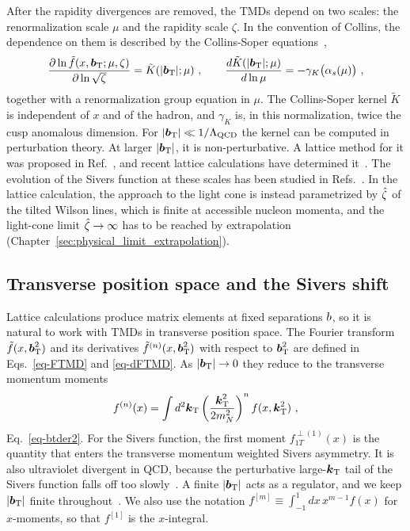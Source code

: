 After the rapidity divergences are removed, the TMDs depend on two scales: the renormalization scale $\mu$ and the rapidity scale $\zeta$. In the convention of Collins, the dependence on them is described by the Collins-Soper equations~\cite{Collins:1981uk,Collins:1984kg,CollinsBook2011},
\begin{equation}
  \frac{\partial\ln\tilde{f}(x,\boldsymbol{b}_{\mathrm T};\mu,\zeta)}{\partial\ln\sqrt{\zeta}} = \tilde{K}(|\boldsymbol{b}_{\mathrm T}|;\mu) \ ,\qquad
  \frac{d\tilde{K}(|\boldsymbol{b}_{\mathrm T}|;\mu)}{d\ln\mu} = -\gamma_K\big(\alpha_s(\mu)\big) \ ,
  \label{eq:cs_equation}
\end{equation}
together with a renormalization group equation in $\mu$. The Collins-Soper kernel $\tilde K$ is independent of $x$ and of the hadron, and $\gamma_K$ is, in this normalization, twice the cusp anomalous dimension. For $|\boldsymbol{b}_{\mathrm T}|\ll 1/\Lambda_{\text{QCD}}$ the kernel can be computed in perturbation theory. At larger $|\boldsymbol{b}_{\mathrm T}|$, it is non-perturbative. A lattice method for it was proposed in Ref.~\cite{Ebert:2018gzl}, and recent lattice calculations have determined it~\cite{Shanahan:2021tst,Schlemmer:2021aij,LatticePartonLPC:2022eev}. The evolution of the Sivers function at these scales has been studied in Refs.~\cite{Aybat:2011ge,Echevarria:2014xaa}. In the lattice calculation, the approach to the light cone is instead parametrized by ${\hat \zeta}$ of the tilted Wilson lines, which is finite at accessible nucleon momenta, and the light-cone limit ${\hat \zeta}\to\infty$ has to be reached by extrapolation (Chapter~\ref{sec:physical_limit_extrapolation}).

\subsection{Transverse position space and the Sivers shift}
\label{sec:bt_space_sivers_shift}

Lattice calculations produce matrix elements at fixed separations $b$, so it is natural to work with TMDs in transverse position space. The Fourier transform $\tilde f(x,\boldsymbol{b}_{\mathrm T}^2)$ and its derivatives $\tilde f^{(n)}(x,\boldsymbol{b}_{\mathrm T}^2)$ with respect to $\boldsymbol{b}_{\mathrm T}^2$ are defined in Eqs.~\eqref{eq-FTMD} and \eqref{eq-dFTMD}. As $|\boldsymbol{b}_{\mathrm T}|\to 0$ they reduce to the transverse momentum moments
\begin{equation}
  f^{(n)}(x) = \int d^2\boldsymbol{k}_{\mathrm T}\left(\frac{\boldsymbol{k}_{\mathrm T}^2}{2m_N^2}\right)^n f(x,\boldsymbol{k}_{\mathrm T}^2) \ ,
\end{equation}
Eq.~\eqref{eq-btder2}. For the Sivers function, the first moment $f_{1T}^{\perp(1)}(x)$ is the quantity that enters the transverse momentum weighted Sivers asymmetry. It is also ultraviolet divergent in QCD, because the perturbative large-$\boldsymbol{k}_{\mathrm T}$ tail of the Sivers function falls off too slowly~\cite{Bacchetta:2008xw}. A finite $|\boldsymbol{b}_{\mathrm T}|$ acts as a regulator, and we keep $|\boldsymbol{b}_{\mathrm T}|$ finite throughout~\cite{Musch:2011er,Boer:2011xd}. We also use the notation $f^{[m]}\equiv\int_{-1}^{1}dx\, x^{m-1} f(x)$ for $x$-moments, so that $f^{[1]}$ is the $x$-integral.

